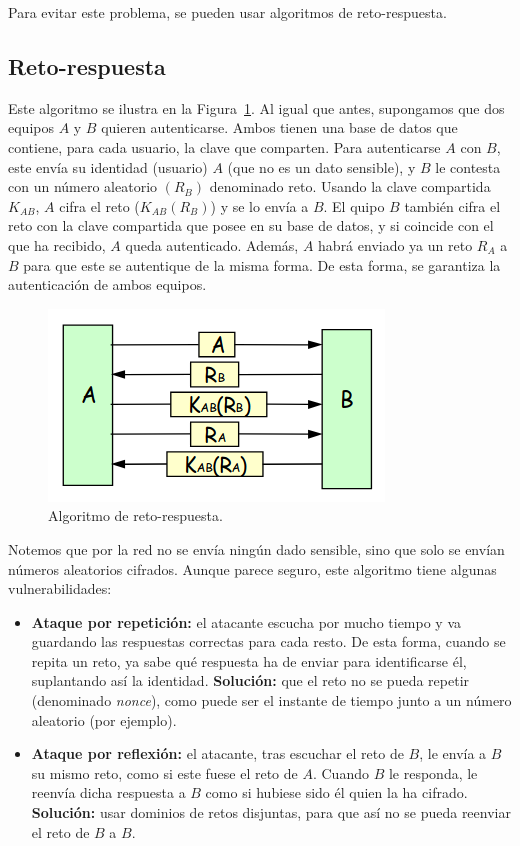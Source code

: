 Para evitar este problema, se pueden usar algoritmos de reto-respuesta.
\subsection{Reto-respuesta}
Este algoritmo se ilustra en la Figura~\ref{fig:reto-respuesta}.
Al igual que antes, supongamos que dos equipos $A$ y $B$ quieren autenticarse. Ambos tienen una base de datos que contiene, para cada usuario, la clave que comparten. Para autenticarse $A$ con $B$, este envía su identidad (usuario) $A$ (que no es un dato sensible), y $B$ le contesta con un número aleatorio $(R_B)$ denominado reto. Usando la clave compartida $K_{AB}$, $A$ cifra el reto ($K_{AB}(R_B)$) y se lo envía a $B$. El quipo $B$ también cifra el reto con la clave compartida que posee en su base de datos, y si coincide con el que ha recibido, $A$ queda autenticado. Además, $A$ habrá enviado ya un reto $R_A$ a $B$ para que este se autentique de la misma forma. De esta forma, se garantiza la autenticación de ambos equipos.\\
\begin{figure}[h]
    \centering
    \includegraphics[width=0.4\linewidth]{./images/reto-respuesta.png}
    \caption{Algoritmo de reto-respuesta.}
    \label{fig:reto-respuesta}
\end{figure}

Notemos que por la red no se envía ningún dado sensible, sino que solo se envían números aleatorios cifrados. Aunque parece seguro, este algoritmo tiene algunas vulnerabilidades:
\begin{itemize}
    \item \textbf{Ataque por repetición:} el atacante escucha por mucho tiempo y va guardando las respuestas correctas para cada resto. De esta forma, cuando se repita un reto, ya sabe qué respuesta ha de enviar para identificarse él, suplantando así la identidad. \textbf{Solución:} que el reto no se pueda repetir (denominado \emph{nonce}), como puede ser el instante de tiempo junto a un número aleatorio (por ejemplo).
    \item \textbf{Ataque por reflexión:} el atacante, tras escuchar el reto de $B$, le envía a $B$ su mismo reto, como si este fuese el reto de $A$. Cuando $B$ le responda, le reenvía dicha respuesta a $B$ como si hubiese sido él quien la ha cifrado. \textbf{Solución:} usar dominios de retos disjuntas, para que así no se pueda reenviar el reto de $B$ a $B$.
\end{itemize}

